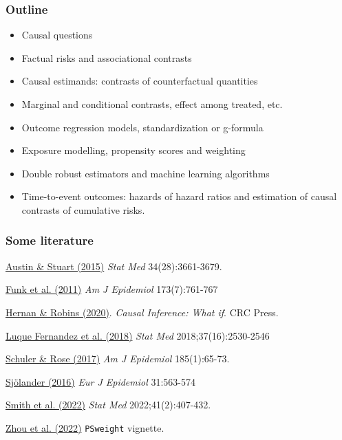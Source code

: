 \documentclass[12pt,dvipsnames,t,aspectratio=169, handout%
]{beamer}
\begin{document}
\begin{frame}
\frametitle{Outline}

\begin{itemize}

\item Causal questions
\medskip
\item Factual risks and associational contrasts 
\medskip
\item Causal estimands: contrasts of counterfactual quantities
\medskip
\item Marginal and conditional contrasts, effect among treated, etc.
\medskip
\item Outcome regression models, standardization or g-formula
\medskip
\item Exposure modelling, propensity scores and weighting 
\medskip
\item Double robust estimators and machine learning algorithms
\medskip
\item Time-to-event outcomes: hazards of hazard ratios and estimation
of causal contrasts of cumulative risks. 

\end{itemize}

\end{frame}

\begin{frame}
\frametitle{\large Some literature}
\bi
\item \href{https://doi.org/10.1002/sim.6607}{\color{blue}Austin \& Stuart (2015)} {\it Stat Med} 34(28):3661-3679.
\medskip 
\item
\href{https://doi.org/10.1093/aje/kwq439}{\color{blue} Funk et al. (2011)} {\it Am J Epidemiol}  173(7):761-767
\medskip
\item
\href{https://www.hsph.harvard.edu/miguel-hernan/causal-inference-book/}
{\color{blue}Hernan \& Robins (2020)}. \textit{Causal Inference: What if}.
CRC Press.
\medskip
\item
\href{https://doi.org/10.1002/sim.7628}{\color{blue}Luque Fernandez et al. (2018)}
{\it Stat Med} 2018;37(16):2530-2546
\medskip
\item
\href{https://doi.org/10.1093/aje/kww165}{\color{blue}Schuler \& Rose (2017)} \textit{Am J Epidemiol} 185(1):65-73.
\medskip
\item 
 \href{https://doi.org/10.1007/s10654-016-0157-3}{\color{blue}Sj{\"o}lander (2016)} {\it Eur J Epidemiol} 31:563-574
\medskip
\item
\href{https://doi.org/10.1002/sim.9234}{\color{blue}Smith et al. (2022)} {\it Stat Med} 2022;41(2):407-432.
\medskip
\item
\href{https://cran.r-project.org/web/packages/PSweight/vignettes/vignette.pdf}{\color{blue}Zhou et al. (2022)} \texttt{PSweight} vignette.

\ei

\end{frame}
\end{document}
